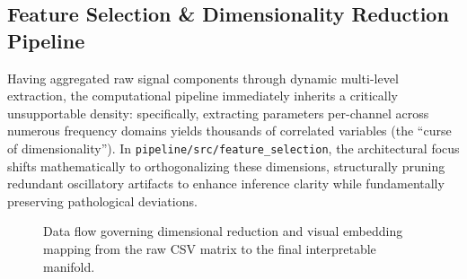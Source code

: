 \subsection{Feature Selection \& Dimensionality Reduction Pipeline}
\label{subsec:feature_selection}

Having aggregated raw signal components through dynamic multi-level extraction, the computational pipeline immediately inherits a critically unsupportable density: specifically, extracting parameters per-channel across numerous frequency domains yields thousands of correlated variables (the ``curse of dimensionality''). In \texttt{pipeline/src/feature\_selection}, the architectural focus shifts mathematically to orthogonalizing these dimensions, structurally pruning redundant oscillatory artifacts to enhance inference clarity while fundamentally preserving pathological deviations.

\begin{figure}[htpb]
    \centering
    \caption{Data flow governing dimensional reduction and visual embedding mapping from the raw CSV matrix to the final interpretable manifold.}
    \label{fig:feat_selection_process}
\end{figure}

